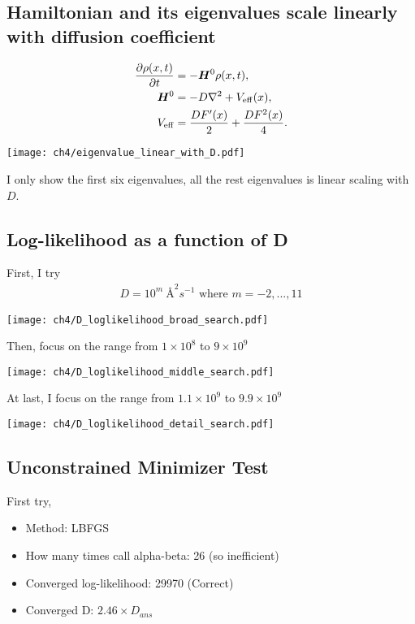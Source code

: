 \subsection{Hamiltonian and its eigenvalues scale linearly with diffusion coefficient}
\begin{align*}
    \frac{\partial \rho(x,t)}{\partial t} &= -\bm{H}^0 \rho(x,t), \\
    \bm{H}^0 &= -D\nabla^2  + V_{\rm eff}(x), \\
    V_{\rm eff}  &= \frac{DF'(x)}{2} + \frac{DF^2(x)}{4}.
\end{align*}
\begin{center}
    \texttt{[image: ch4/eigenvalue\_linear\_with\_D.pdf]}   
\end{center}
I only show the first six eigenvalues, all the rest eigenvalues is linear scaling with $D$.

\subsection{Log-likelihood as a function of D}
First, I try 
\begin{align*}
    D = 10^{m}~\si{\angstrom}^{2}s^{-1}\text{   where } m=-2,...,11
\end{align*}
\begin{center}
    \texttt{[image: ch4/D\_loglikelihood\_broad\_search.pdf]} 
\end{center}
Then, focus on the range from $1 \times 10^{8}$ to $9 \times 10^{9}$
\begin{center}
    \texttt{[image: ch4/D\_loglikelihood\_middle\_search.pdf]}   
\end{center}
At last, I focus on the range from $1.1 \times 10^{9}$ to $9.9 \times 10^{9}$
\begin{center}
    \texttt{[image: ch4/D\_loglikelihood\_detail\_search.pdf]}   
\end{center}

\subsection{Unconstrained Minimizer Test}
First try, 
\begin{itemize}
    \item Method: LBFGS
    \item How many times call alpha-beta: 26 (so inefficient)
    \item Converged log-likelihood: 29970 (Correct)
    \item Converged D: $2.46 \times D_{ans}$ 
\end{itemize}

